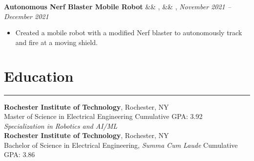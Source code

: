 \documentclass[letterpaper,10pt]{article}
\newcommand{\heading}[1]{%
    \vspace{-5mm} %
    \section*{#1}%
    \vspace{-3mm}%
    \noindent\hrule height 0.5pt %
    \vspace{4mm}%
}
\newcommand{\experience}[5]{%
    \vspace{-1mm}%
    \noindent\textbf{#1}%
    \ifx&#2&
    \else
        , \textit{#2}%
    \fi
    \ifx&#3&
    \else
        , #3%
    \fi
    \hfill \textit{#4} \\
    \vspace{-6.8mm}%
    \begin{itemize}[itemsep=-5pt]
        \setlength{\itemindent}{0em}
        #5
    \end{itemize}
}
\begin{document}
\experience
    {Autonomous Nerf Blaster Mobile Robot}
    {}
    {}
    {November 2021 – December 2021}
    {
        \item  Created a mobile robot with a modified Nerf blaster to autonomously track and fire at a moving shield.
    }


\vspace{-0.5em}
\heading{Education}
\vspace{-1mm}%
\noindent\textbf{Rochester Institute of Technology}, Rochester, NY \\
Master of Science in Electrical Engineering \hfill Cumulative GPA: 3.92 \\
\textit{Specialization in Robotics and AI/ML} \\
\noindent\textbf{Rochester Institute of Technology}, Rochester, NY \\
Bachelor of Science in Electrical Engineering, \textit{Summa Cum Laude} \hfill Cumulative GPA: 3.86 \\
\end{document}
